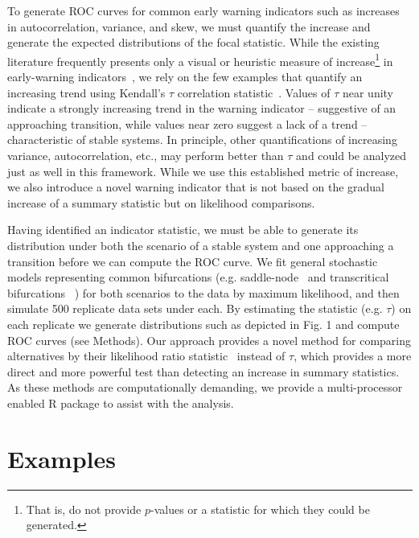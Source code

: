 \documentclass{pnastwo}
\begin{document}
\begin{article}
To generate ROC curves for common early warning indicators such as 
increases in autocorrelation, variance, and skew, 
we must quantify the increase and generate the expected distributions of the focal statistic.  
While the existing literature frequently presents only a 
visual or heuristic measure of increase\footnote{That is, do not provide $p$-values or a statistic for which they could be generated.} in early-warning indicators~\cite{Scheffer2009, Drake2010, Carpenter2011, Carpenter2006}, 
we rely on the few examples that quantify an increasing trend using Kendall's $\tau$ correlation statistic~\cite{Dakos2008, Dakos2011, Dakos2009}.
Values of $\tau$ near unity indicate a strongly increasing trend in the warning indicator --
suggestive of an approaching transition, while values near zero suggest a lack of a trend -- characteristic of stable systems.
In principle, other quantifications of increasing variance, autocorrelation, etc.,
may perform better than $\tau$ and could be analyzed just as well in this framework. 
While we use this established metric of increase, we also introduce a novel warning indicator
that is not based on the gradual increase of a summary statistic but on likelihood comparisons.  

Having identified an indicator statistic,
we must be able to generate its distribution under both the scenario of a stable system and 
one approaching a transition before we can compute the ROC curve.
We fit general stochastic models representing common bifurcations
(e.g. saddle-node~\cite{Scheffer2009, Guttal2008a, VanNes2007, Biggs2009} and transcritical bifurcations~\cite{Drake2010} )
for both scenarios to the data by maximum likelihood, and then simulate 500 replicate data sets under each⁠. 
By estimating the statistic (e.g. $\tau$) on each replicate we generate distributions such as depicted in Fig. 1 and compute ROC curves (see Methods).
Our approach provides a novel method for comparing alternatives by their likelihood ratio statistic~\cite{Cox1961}⁠ instead of $\tau$,
which provides a more direct and more powerful test than detecting an increase in summary statistics.
As these methods are computationally demanding, we provide a multi-processor enabled R package to assist with the analysis. 

\section{Examples}


\end{article}
\end{document}

